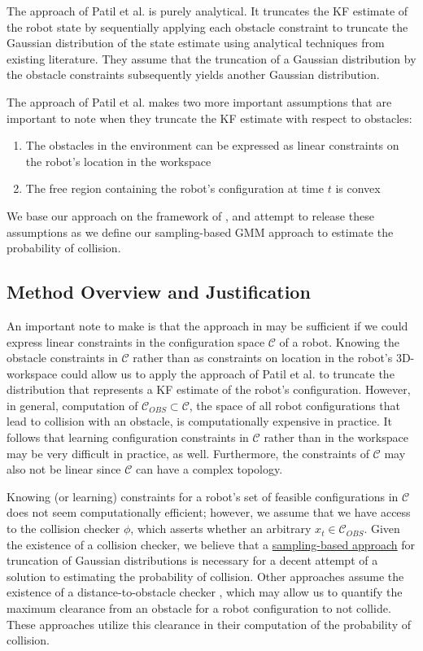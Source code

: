 \documentclass[journal]{IEEEtran}
\begin{document}
The approach of Patil et al. is purely analytical. It truncates the KF estimate of the robot state by sequentially applying each obstacle constraint to truncate the Gaussian distribution of the state estimate using analytical techniques from existing literature. They assume that the truncation of a Gaussian distribution by the obstacle constraints subsequently yields another Gaussian distribution.

The approach of Patil et al. makes two more important assumptions that are important to note when they truncate the KF estimate with respect to obstacles:
\begin{enumerate}
  \item The obstacles in the environment can be expressed as linear constraints on the robot's location in the workspace
  \item The free region containing the robot's configuration at time $t$ is convex
\end{enumerate}

We base our approach on the framework of \cite{IEEEhowto:patil}, and attempt to release these assumptions as we define our sampling-based GMM approach to estimate the probability of collision.

\subsection{Method Overview and Justification}

An important note to make is that the approach in \cite{IEEEhowto:patil} may be sufficient if we could express linear constraints in the configuration space $\mathcal{C}$ of a robot. Knowing the obstacle constraints in  $\mathcal{C}$ rather than as constraints on location in the robot's 3D-workspace could allow us to apply the approach of Patil et al. to truncate the distribution that represents a KF estimate of the robot's configuration. However, in general, computation of $\mathcal{C}_{OBS} \subset \mathcal{C}$, the space of all robot configurations that lead to collision with an obstacle, is computationally expensive in practice. It follows that learning configuration constraints in $\mathcal{C}$ rather than in the workspace may be very difficult in practice, as well. Furthermore, the constraints of $\mathcal{C}$ may also not be linear since $\mathcal{C}$ can have a complex topology.

Knowing (or learning) constraints for a robot's set of feasible configurations in $\mathcal{C}$ does not seem computationally efficient; however, we assume that we have access to the collision checker $\phi$, which asserts whether an arbitrary $x_t \in \mathcal{C}_{OBS}$. Given the existence of a collision checker, we believe that a \underline{sampling-based approach} for truncation of Gaussian distributions is necessary for a decent attempt of a solution to estimating the probability of collision. Other approaches assume the existence of a distance-to-obstacle checker \cite{IEEEhowto:van_den_berg}, which may allow us to quantify the maximum clearance from an obstacle for a robot configuration to not collide. These approaches utilize this clearance in their computation of the probability of collision.
\end{document}
